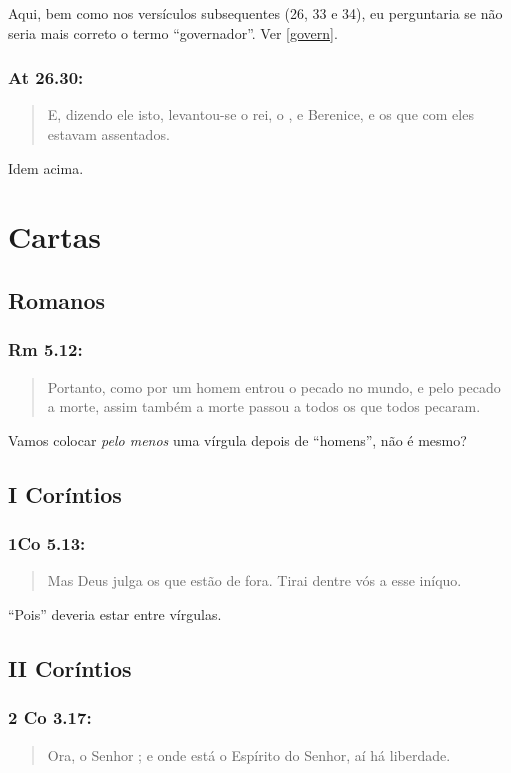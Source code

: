 Aqui, bem como nos versículos subsequentes (26, 33 e 34), eu
perguntaria se não seria mais correto o termo ``governador''. Ver \ref{govern}.

\subsection{At 26.30:}
\begin{quote}
    \small
E, dizendo ele isto, levantou-se o rei, o , e Berenice, e os que com eles estavam assentados.
\end{quote}
Idem acima.

\chapter{Cartas}
\section{Romanos}
\subsection{Rm 5.12:}
\begin{quote}
    \small
Portanto, como por um homem entrou o pecado no mundo, e
 pelo pecado a morte, assim também a morte passou a todos os  que todos pecaram.
\end{quote}

Vamos colocar \emph{pelo menos} uma vírgula depois de ``homens'', não é mesmo?


\section{I Coríntios}
\subsection{1Co 5.13:}
\begin{quote}
    \small
Mas Deus julga os que estão de fora. Tirai  dentre vós a esse iníquo.
\end{quote}

``Pois'' deveria estar entre vírgulas.

\section{II Coríntios}
\subsection{2 Co 3.17:}
\begin{quote}
    \small
Ora, o Senhor ; e onde está o Espírito do
Senhor, aí há liberdade.
\end{quote}

